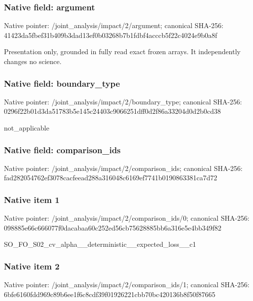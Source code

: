 \documentclass[10pt,a4paper]{article}
\begin{document}
\subsubsection{Native field: argument}


Native pointer: /joint\_analysis/impact/2/argument; canonical SHA-256: 41423da5fbef31b409b3dad1\allowbreak{}3ef0b03268b7b1fdbf4acccb\allowbreak{}5f22c4024e9b0a8f


Presentation only, grounded in fully read exact frozen arrays. It independently changes no science.


\subsubsection{Native field: boundary\_type}


Native pointer: /joint\_analysis/impact/2/boundary\_type; canonical SHA-256: 0296f22b01d3da51783b5e14\allowbreak{}5c24403c9066251dff0d2f86\allowbreak{}a33204d0d2b0cd38


not\_applicable


\subsubsection{Native field: comparison\_ids}


Native pointer: /joint\_analysis/impact/2/comparison\_ids; canonical SHA-256: fad282054762ef3078cacfee\allowbreak{}ad288a316048c6169ef7741b\allowbreak{}0190863381ca7d72



\subsubsection{Native item 1}


Native pointer: /joint\_analysis/impact/2\allowbreak{}/comparison\_ids/0; canonical SHA-256: 098885e66c666077f0dacaba\allowbreak{}a60c252ed56cb75628885bb6\allowbreak{}a316e5e4bb349f82


SO\_FO\_S02\_cv\_alpha\_\_dete\allowbreak{}rministic\_\_expected\_loss\allowbreak{}\_\_c1


\subsubsection{Native item 2}


Native pointer: /joint\_analysis/impact/2\allowbreak{}/comparison\_ids/1; canonical SHA-256: 6bfe6160fdd969c89b6ee1f6\allowbreak{}c8cdf39f01926221cbb70bc4\allowbreak{}20136b8f50f87665
\end{document}
